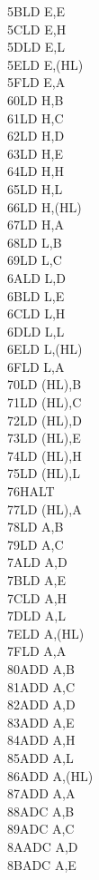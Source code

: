 \documentclass[oneside,a4paper]{book}
\begin{document}
\begin{multicols}{3}
{\begin{tabbing}
5B\>LD E,E\\
5C\>LD E,H\\
5D\>LD E,L\\
5E\>LD E,(HL)\\
5F\>LD E,A\\
60\>LD H,B\\
61\>LD H,C\\
62\>LD H,D\\
63\>LD H,E\\
64\>LD H,H\\
65\>LD H,L\\
66\>LD H,(HL)\\
67\>LD H,A\\
68\>LD L,B\\
69\>LD L,C\\
6A\>LD L,D\\
6B\>LD L,E\\
6C\>LD L,H\\
6D\>LD L,L\\
6E\>LD L,(HL)\\
6F\>LD L,A\\
70\>LD (HL),B\\
71\>LD (HL),C\\
72\>LD (HL),D\\
73\>LD (HL),E\\
74\>LD (HL),H\\
75\>LD (HL),L\\
76\>HALT\\
77\>LD (HL),A\\
78\>LD A,B\\
79\>LD A,C\\
7A\>LD A,D\\
7B\>LD A,E\\
7C\>LD A,H\\
7D\>LD A,L\\
7E\>LD A,(HL)\\
7F\>LD A,A\\
80\>ADD A,B\\
81\>ADD A,C\\
82\>ADD A,D\\
83\>ADD A,E\\
84\>ADD A,H\\
85\>ADD A,L\\
86\>ADD A,(HL)\\
87\>ADD A,A\\
88\>ADC A,B\\
89\>ADC A,C\\
8A\>ADC A,D\\
8B\>ADC A,E\\

\end{tabbing}}
\end{multicols}
\end{document}
